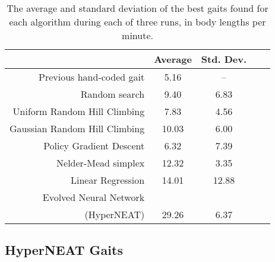 \begin{table}
\begin{center}
\begin{tabular}{|r|c|c|c||c|}
\hline
                                         & Average & Std. Dev. \\
\hline                                    
\hline                                    
Previous hand-coded gait                 & 5.16   &   --     \\
\hline
Random search                            & 9.40   &   6.83   \\
\hline
Uniform Random Hill Climbing             & 7.83   &   4.56   \\
\hline
Gaussian Random Hill Climbing            & 10.03  &   6.00   \\
\hline
Policy Gradient Descent                  & 6.32   &   7.39   \\
\hline
Nelder-Mead simplex                      & 12.32  &   3.35   \\
\hline
Linear Regression                        & 14.01  &  12.88   \\
\hline
Evolved Neural Network              &        &          \\
(HyperNEAT)                              & 29.26  &   6.37   \\
\hline
\end{tabular}
\caption{The average and standard deviation of the best gaits found
  for each algorithm during each of three runs, in body lengths per
  minute.}  
\end{center}
\end{table}







\subsection{HyperNEAT Gaits}

